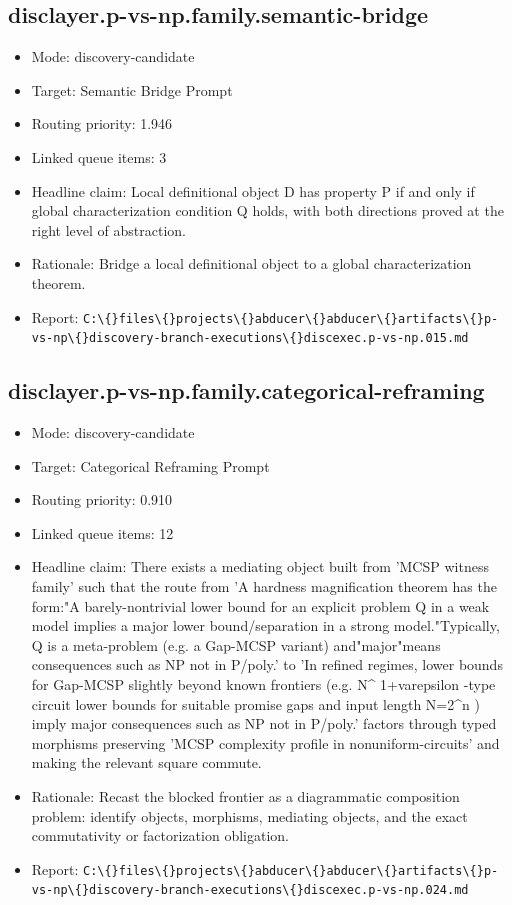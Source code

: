 \documentclass[11pt]{article}
\begin{document}
\subsection*{disclayer.p-vs-np.family.semantic-bridge}
\begin{itemize}
\item Mode: discovery-candidate
\item Target: Semantic Bridge Prompt
\item Routing priority: 1.946
\item Linked queue items: 3
\item Headline claim: Local definitional object D has property P if and only if global characterization condition Q holds, with both directions proved at the right level of abstraction.
\item Rationale: Bridge a local definitional object to a global characterization theorem.
\item Report: \texttt{C:\textbackslash\{\}files\textbackslash\{\}projects\textbackslash\{\}abducer\textbackslash\{\}abducer\textbackslash\{\}artifacts\textbackslash\{\}p-vs-np\textbackslash\{\}discovery-branch-executions\textbackslash\{\}discexec.p-vs-np.015.md}
\end{itemize}

\subsection*{disclayer.p-vs-np.family.categorical-reframing}
\begin{itemize}
\item Mode: discovery-candidate
\item Target: Categorical Reframing Prompt
\item Routing priority: 0.910
\item Linked queue items: 12
\item Headline claim: There exists a mediating object built from 'MCSP witness family' such that the route from 'A hardness magnification theorem has the form:"A barely-nontrivial lower bound for an explicit problem Q in a weak model implies a major lower bound/separation in a strong model."Typically, Q is a meta-problem (e.g. a Gap-MCSP variant) and"major"means consequences such as NP not in P/poly.' to 'In refined regimes, lower bounds for Gap-MCSP slightly beyond known frontiers (e.g. N\textasciicircum{} 1+varepsilon -type circuit lower bounds for suitable promise gaps and input length N=2\textasciicircum{}n ) imply major consequences such as NP not in P/poly.' factors through typed morphisms preserving 'MCSP complexity profile in nonuniform-circuits' and making the relevant square commute.
\item Rationale: Recast the blocked frontier as a diagrammatic composition problem: identify objects, morphisms, mediating objects, and the exact commutativity or factorization obligation.
\item Report: \texttt{C:\textbackslash\{\}files\textbackslash\{\}projects\textbackslash\{\}abducer\textbackslash\{\}abducer\textbackslash\{\}artifacts\textbackslash\{\}p-vs-np\textbackslash\{\}discovery-branch-executions\textbackslash\{\}discexec.p-vs-np.024.md}
\end{itemize}
\end{document}

